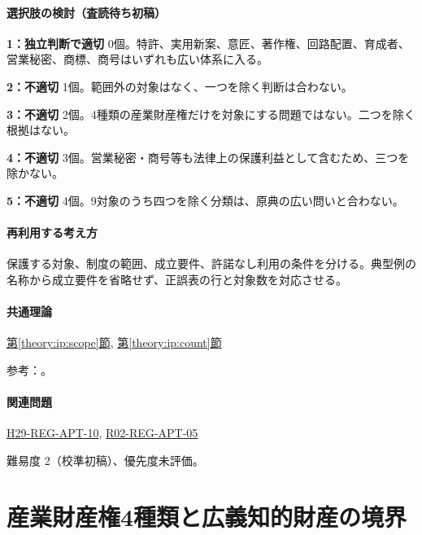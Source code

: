 \paragraph{選択肢の検討（査読待ち初稿）}\mbox{}\par

\noindent\textbf{1：独立判断で適切} 0個。特許、実用新案、意匠、著作権、回路配置、育成者、営業秘密、商標、商号はいずれも広い体系に入る。\par

\noindent\textbf{2：不適切} 1個。範囲外の対象はなく、一つを除く判断は合わない。\par

\noindent\textbf{3：不適切} 2個。4種類の産業財産権だけを対象にする問題ではない。二つを除く根拠はない。\par

\noindent\textbf{4：不適切} 3個。営業秘密・商号等も法律上の保護利益として含むため、三つを除かない。\par

\noindent\textbf{5：不適切} 4個。9対象のうち四つを除く分類は、原典の広い問いと合わない。\par

\paragraph{再利用する考え方} 保護する対象、制度の範囲、成立要件、許諾なし利用の条件を分ける。典型例の名称から成立要件を省略せず、正誤表の行と対象数を対応させる。

\paragraph{共通理論} \hyperref[theory:ip:scope]{第\ref*{theory:ip:scope}節}, \hyperref[theory:ip:count]{第\ref*{theory:ip:count}節}

\par 参考：\cite{ip_basic_act,ip_broad_scope}。

\paragraph{関連問題} \hyperref[q:h29-reg-apt-10]{H29-REG-APT-10}, \hyperref[q:r02-reg-apt-05]{R02-REG-APT-05}

\par 難易度 2（校準初稿）、優先度未評価。

\section{産業財産権4種類と広義知的財産の境界}

